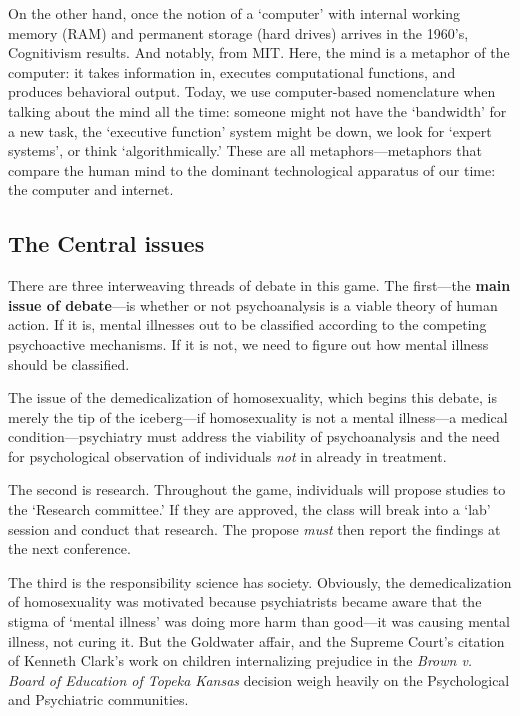 \begin{refsection}
On the other hand, once the notion of a ‘computer’ with internal working memory (RAM) and permanent storage (hard drives) arrives in the 1960’s, Cognitivism results. And notably, from MIT. Here, the mind is a metaphor of the computer: it takes information in, executes computational functions, and produces behavioral output. Today, we use computer-based nomenclature when talking about the mind all the time: someone might not have the ‘bandwidth’ for a new task, the ‘executive function’ system might be down, we look for ‘expert systems’, or think ‘algorithmically.’ These are all metaphors---metaphors that compare the human mind to the dominant technological apparatus of our time: the computer and internet.

\subsection{The Central issues}
\label{thecentralissues}

There are three interweaving threads of debate in this game. The first---the \textbf{main issue of debate}---is whether or not psychoanalysis is a viable theory of human action. If it is, mental illnesses out to be classified according to the competing psychoactive mechanisms. If it is not, we need to figure out how mental illness should be classified.

The issue of the demedicalization of homosexuality, which begins this debate, is merely the tip of the iceberg---if homosexuality is not a mental illness---a medical condition---psychiatry must address the viability of psychoanalysis and the need for psychological observation of individuals \emph{not} in already in treatment.

The second is research. Throughout the game, individuals will propose studies to the ‘Research committee.’ If they are approved, the class will break into a ‘lab’ session and conduct that research. The propose \emph{must} then report the findings at the next conference.

The third is the responsibility science has society. Obviously, the demedicalization of homosexuality was motivated because psychiatrists became aware that the stigma of ‘mental illness’ was doing more harm than good---it was causing mental illness, not curing it. But the Goldwater affair, and the Supreme Court’s citation of Kenneth Clark’s work on children internalizing prejudice in the \emph{Brown v. Board of Education of Topeka Kansas} decision weigh heavily on the Psychological and Psychiatric communities.


\end{refsection}
